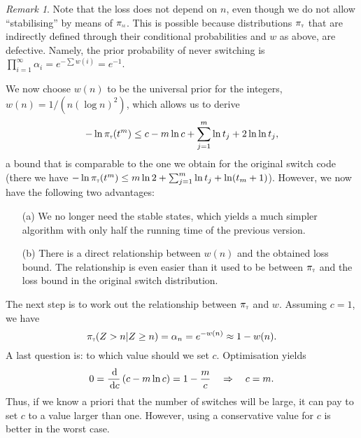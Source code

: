 \documentclass[a4paper]{article}
\theoremstyle{example}
\theoremstyle{remark}
\newtheorem{remark}{Remark}[section]
\newcommand{\del}[1]{\left(#1\right)}
\newcommand{\dif}{\,\textnormal{d}}
\newcommand{\pim}{\ensuremath{\pi_\textsc{\tiny{m}}}}
\newcommand{\pit}{\ensuremath{\pi_\textsc{\tiny{t}}}}
\begin{document}
\begin{remark}
  Note that the loss does not depend on $n$, even though we do not
  allow ``stabilising'' by means of $\pim$. This is possible because
  distributions $\pit$ that are indirectly defined through their
  conditional probabilities and $w$ as above, are defective. Namely,
  the prior probability of never switching is
  $\prod_{i=1}^\infty\alpha_i=e^{-\sum w(i)}=e^{-1}$.
\end{remark}
We now choose $w(n)$ to be the universal prior for the integers,
$w(n)=1/(n(\log n)^2)$, which allows us to derive
\begin{equation}
  -\ln\pit(t^m)\le c-m\ln c+\sum_{j=1}^m\ln t_j+2\ln\ln t_j,
\end{equation}
a bound that is comparable to the one we obtain for the original
switch code (there we have $-\ln\pit(t^m)\le
m\ln2+\sum_{j=1}^m\ln t_j+\ln(t_m+1)$). However, we now have the following
two advantages:
\begin{itemize}
\item[(a)] We no longer need the stable states, which yields a much
  simpler algorithm with only half the running time of the previous
  version.
\item[(b)] There is a direct relationship between $w(n)$ and the
  obtained loss bound. The relationship is even easier than it used to
  be between $\pit$ and the loss bound in the original switch
  distribution.
\end{itemize}

\noindent The next step is to work out the relationship between $\pit$
and $w$. Assuming $c=1$, we have
\begin{equation}
  \pit(Z>n|Z\ge n)=\alpha_n=e^{-w(n)}\approx 1-w(n).
\end{equation}
A last question is: to which value should we set $c$. Optimisation
yields
\begin{equation}
0=\frac{\dif}{\dif c}\del{c-m\ln c}=1-\frac{m}{c}\quad\Rightarrow\quad c=m.
\end{equation}
Thus, if we know a priori that the number of switches will be large,
it can pay to set $c$ to a value larger than one. However, using a
conservative value for $c$ is better in the worst case.

\newpage
\end{document}
